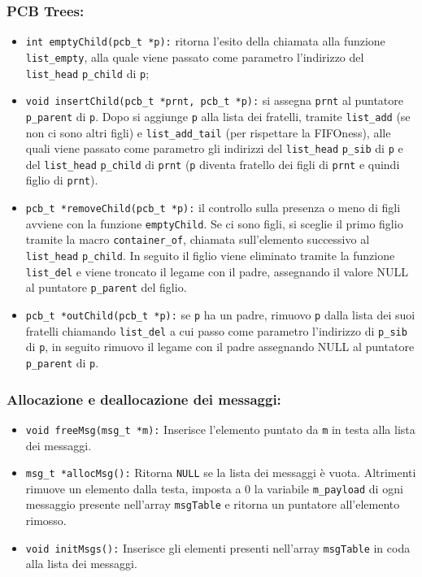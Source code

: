 \documentclass{article}
\begin{document}
\subsubsection{PCB Trees:}
\begin{itemize}
    \item \texttt{int emptyChild(pcb\_t *p):} ritorna l'esito della chiamata alla funzione \texttt{list\_empty}, alla quale viene passato come parametro l'indirizzo del \texttt{list\_head} \texttt{p\_child} di \texttt{p};
    \item \texttt{void insertChild(pcb\_t *prnt, pcb\_t *p):} si assegna \texttt{prnt} al puntatore \texttt{p\_parent} di \texttt{p}. Dopo si aggiunge \texttt{p} alla lista dei fratelli, tramite \texttt{list\_add} (se non ci sono altri figli) e \texttt{list\_add\_tail} (per rispettare la FIFOness), alle quali viene passato come parametro gli indirizzi del \texttt{list\_head} \texttt{p\_sib} di \texttt{p} e del \texttt{list\_head} \texttt{p\_child} di \texttt{prnt} (\texttt{p} diventa fratello dei figli di \texttt{prnt} e quindi figlio di \texttt{prnt}).
    \item \texttt{pcb\_t *removeChild(pcb\_t *p):} il controllo sulla presenza o meno di figli avviene con la funzione \texttt{emptyChild}. Se ci sono figli, si sceglie il primo figlio tramite la macro \texttt{container\_of}, chiamata sull'elemento successivo al \texttt{list\_head} \texttt{p\_child}. In seguito il figlio viene eliminato tramite la funzione \texttt{list\_del} e viene troncato il legame con il padre, assegnando il valore NULL al puntatore \texttt{p\_parent} del figlio.
    \item \texttt{pcb\_t *outChild(pcb\_t *p):} se \texttt{p} ha un padre, rimuovo \texttt{p} dalla lista dei suoi fratelli chiamando \texttt{list\_del} a cui passo come parametro l'indirizzo di \texttt{p\_sib} di \texttt{p}, in seguito rimuovo il legame con il padre assegnando NULL al puntatore \texttt{p\_parent} di \texttt{p}.
\end{itemize}

\subsubsection{Allocazione e deallocazione dei messaggi:}
\begin{itemize}
    \item \texttt{void freeMsg(msg\_t *m):} Inserisce l’elemento puntato da \texttt{m} in testa alla lista dei messaggi.
    \item \texttt{msg\_t *allocMsg():} Ritorna \texttt{NULL} se la lista dei messaggi è vuota. Altrimenti rimuove un elemento dalla testa, imposta a 0 la variabile \texttt{m\_payload} di ogni messaggio presente nell’array \texttt{msgTable} e ritorna un puntatore all’elemento rimosso.
    \item \texttt{void initMsgs():} Inserisce gli elementi presenti nell’array \texttt{msgTable} in coda alla lista dei messaggi.
\end{itemize}
\end{document}
